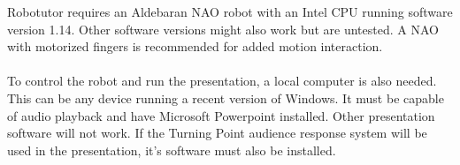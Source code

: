 Robotutor requires an Aldebaran NAO robot with an Intel CPU running software version 1.14. Other software versions might also work but are untested. A NAO with motorized fingers is recommended for added motion interaction.\\
\\
To control the robot and run the presentation, a local computer is also needed. This can be any device running a recent version of Windows. It must be capable of audio playback and have Microsoft Powerpoint installed. Other presentation software will not work. If the Turning Point audience response system will be used in the presentation, it's software must also be installed.

